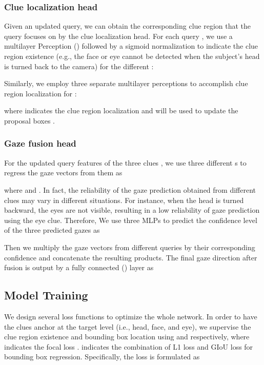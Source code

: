\documentclass[journal]{IEEEtran}
\begin{document}
\subsubsection{\textbf{Clue localization head}}

Given an updated query, we can obtain the corresponding clue region that the query focuses on by the clue localization head. For each query , we use a multilayer Perception () followed by a sigmoid normalization to indicate the clue region existence (e.g., the face or eye cannot be detected when the subject's head is turned back to the camera)  for the different :


Similarly, we employ three separate multilayer perceptions to accomplish clue region localization for :

where  indicates the clue region localization and will be used to update the proposal boxes .

\subsubsection{\textbf{Gaze fusion head}}
For the updated query features of the three clues , we use three different s to regress the gaze vectors  from them as


where  and . In fact, the reliability of the gaze prediction obtained from different clues may vary in different situations. For instance, when the head is turned backward, the eyes are not visible, resulting in a low reliability of gaze prediction using the eye clue. Therefore, We use three MLPs to predict the confidence level  of the three predicted gazes as

Then we multiply the gaze vectors from different queries by their corresponding confidence and concatenate the resulting products.
The final gaze direction  after fusion is output by a fully connected () layer as



\subsection{Model Training}
We design several loss functions to optimize the whole network. In order to have the clues anchor at the target level (i.e., head, face, and eye), we supervise the clue region existence  and bounding box location  using   and  respectively, where  indicates the focal loss \cite{focalloss}.  indicates the combination of L1 loss and GIoU loss \cite{Giou} for bounding box regression. Specifically, the loss  is formulated as
\end{document}
